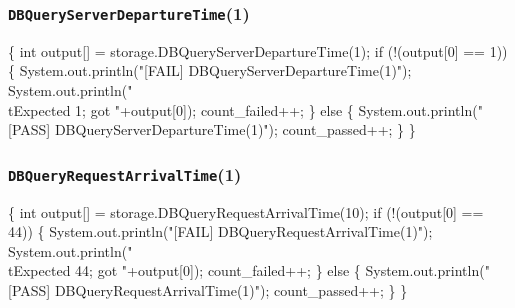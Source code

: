 \documentclass{article}
\def\nwendcode{\endtrivlist \endgroup}
\let\nwdocspar=\par
\begin{document}
\subsubsection{{\tt{}DBQueryServerDepartureTime}(1)}
\nwenddocs{}\endmoddef{}
\{
  int output[] = storage.DBQueryServerDepartureTime(1);
  if (!(output[0] == 1)) \{
    System.out.println("[FAIL] DBQueryServerDepartureTime(1)");
    System.out.println("\\tExpected 1; got "+output[0]);
    count_failed++;
  \} else \{
    System.out.println("[PASS] DBQueryServerDepartureTime(1)");
    count_passed++;
  \}
\}
\nwendcode{}\nwdocspar
\subsubsection{{\tt{}DBQueryRequestArrivalTime}(1)}
\nwenddocs{}\endmoddef{}
\{
  int output[] = storage.DBQueryRequestArrivalTime(10);
  if (!(output[0] == 44)) \{
    System.out.println("[FAIL] DBQueryRequestArrivalTime(1)");
    System.out.println("\\tExpected 44; got "+output[0]);
    count_failed++;
  \} else \{
    System.out.println("[PASS] DBQueryRequestArrivalTime(1)");
    count_passed++;
  \}
\}
\nwendcode{}\nwdocspar
\end{document}
